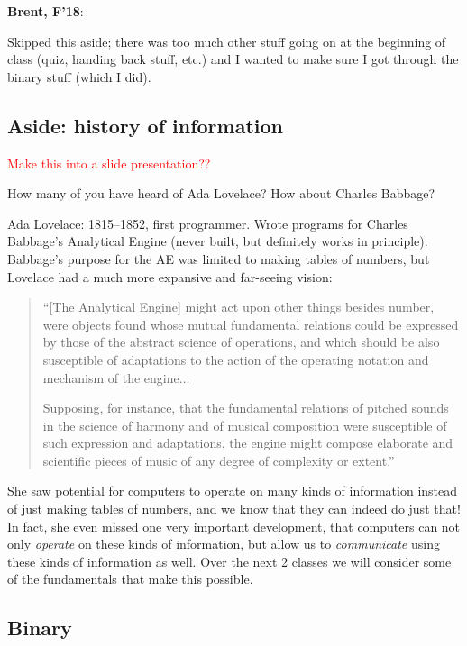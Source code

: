 \documentclass{article}
\newenvironment{reflect}[1]
{
  \noindent
  \begin{lrbox}{\reflectbox}
    \begin{minipage}[t]{\textwidth}
      \textbf{#1}:
}{
    \end{minipage}
  \end{lrbox}
  \fbox{\usebox{\reflectbox}}
}
\begin{document}
\begin{reflect}{Brent, F'18}
  Skipped this aside; there was too much other stuff going on at the
  beginning of class (quiz, handing back stuff, etc.) and I wanted to
  make sure I got through the binary stuff (which I did).
\end{reflect}

\subsection*{Aside: history of information}

\textcolor{red}{Make this into a slide presentation??}

How many of you have heard of Ada Lovelace?  How about Charles
Babbage?

Ada Lovelace: 1815--1852, first programmer.  Wrote
programs for Charles Babbage's Analytical Engine (never built, but
definitely works in principle).  Babbage's purpose for the AE was
limited to making tables of numbers, but Lovelace had a much more
expansive and far-seeing vision:

\begin{quote}
``[The Analytical Engine] might act upon other things besides number,
were objects found whose mutual fundamental relations could be
expressed by those of the abstract science of operations, and which
should be also susceptible of adaptations to the action of the
operating notation and mechanism of the engine...

Supposing, for instance, that the fundamental relations of pitched
sounds in the science of harmony and of musical composition were
susceptible of such expression and adaptations, the engine might
compose elaborate and scientific pieces of music of any degree of
complexity or extent.''
\end{quote}

She saw potential for computers to operate on many kinds of
information instead of just making tables of numbers, and we know that
they can indeed do just that!  In fact, she even missed one very
important development, that computers can not only \emph{operate} on
these kinds of information, but allow us to \emph{communicate} using
these kinds of information as well.  Over the next 2 classes we will
consider some of the fundamentals that make this possible.

\subsection*{Binary}
\end{document}
